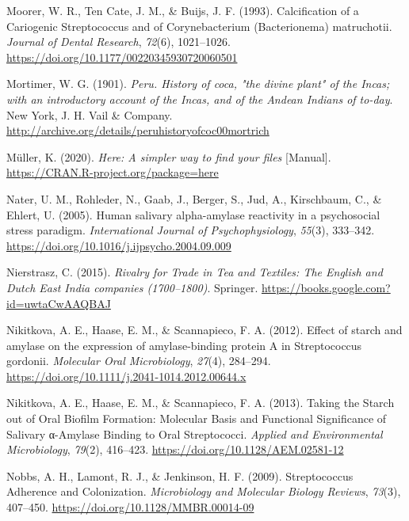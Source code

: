 \documentclass[
  letterpaper,
]{book}
\newlength{\cslhangindent}
\newlength{\cslentryspacingunit} %
\newenvironment{CSLReferences}[2] %
 {%
  \setlength{\parindent}{0pt}
  \ifodd #1
  \let\oldpar\par
  \def\par{\hangindent=\cslhangindent\oldpar}
  \fi
  \setlength{\parskip}{#2\cslentryspacingunit}
 }%
 {}
\begin{document}
\begin{CSLReferences}{1}{0}
\leavevmode{}%
Moorer, W. R., Ten Cate, J. M., \& Buijs, J. F. (1993). Calcification of
a {Cariogenic Streptococcus} and of {Corynebacterium} ({Bacterionema})
matruchotii. \emph{Journal of Dental Research}, \emph{72}(6),
1021--1026. \url{https://doi.org/10.1177/00220345930720060501}

\leavevmode{}%
Mortimer, W. G. (1901). \emph{Peru. {History} of coca, "the divine
plant" of the {Incas}; with an introductory account of the {Incas}, and
of the {Andean Indians} of to-day}. {New York, J. H. Vail \& Company}.
\url{http://archive.org/details/peruhistoryofcoc00mortrich}

\leavevmode{}%
Müller, K. (2020). \emph{Here: {A} simpler way to find your files}
{[}Manual{]}. \url{https://CRAN.R-project.org/package=here}

\leavevmode{}%
Nater, U. M., Rohleder, N., Gaab, J., Berger, S., Jud, A., Kirschbaum,
C., \& Ehlert, U. (2005). Human salivary alpha-amylase reactivity in a
psychosocial stress paradigm. \emph{International Journal of
Psychophysiology}, \emph{55}(3), 333--342.
\url{https://doi.org/10.1016/j.ijpsycho.2004.09.009}

\leavevmode{}%
Nierstrasz, C. (2015). \emph{Rivalry for {Trade} in {Tea} and
{Textiles}: {The English} and {Dutch East India} companies
(1700--1800)}. {Springer}.
\url{https://books.google.com?id=uwtaCwAAQBAJ}

\leavevmode{}%
Nikitkova, A. E., Haase, E. M., \& Scannapieco, F. A. (2012). Effect of
starch and amylase on the expression of amylase-binding protein {A} in
{Streptococcus} gordonii. \emph{Molecular Oral Microbiology},
\emph{27}(4), 284--294.
\url{https://doi.org/10.1111/j.2041-1014.2012.00644.x}

\leavevmode{}%
Nikitkova, A. E., Haase, E. M., \& Scannapieco, F. A. (2013). Taking the
{Starch} out of {Oral Biofilm Formation}: {Molecular Basis} and
{Functional Significance} of {Salivary} α-{Amylase Binding} to {Oral
Streptococci}. \emph{Applied and Environmental Microbiology},
\emph{79}(2), 416--423. \url{https://doi.org/10.1128/AEM.02581-12}

\leavevmode{}%
Nobbs, A. H., Lamont, R. J., \& Jenkinson, H. F. (2009). Streptococcus
{Adherence} and {Colonization}. \emph{Microbiology and Molecular Biology
Reviews}, \emph{73}(3), 407--450.
\url{https://doi.org/10.1128/MMBR.00014-09}


\end{CSLReferences}
\end{document}
